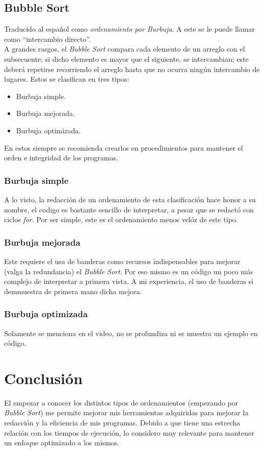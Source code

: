 \documentclass[letterpaper, 12pt]{article}
\begin{document}
    \subsection{Bubble Sort}
    Traducido al español como \emph{ordenamiento por Burbuja}. A este se le puede llamar como ``intercambio directo''. \\\newline
    A grandes rasgos, el \emph{Bubble Sort} compara cada elemento de un arreglo con el subsecuente; si dicho elemento es mayor que el siguiente, se intercambian; este deberá repetirse recorriendo el arreglo hasta que no ocurra ningún intercambio de lugares.
    Estos se clasifican en tres tipos:
    \begin{itemize}
        \item Burbuja simple.
        \item Burbuja mejorada.
        \item Burbuja optimizada.
    \end{itemize}
    En estos siempre se recomienda crearlos en procedimientos para mantener el orden e integridad de los programas.
    \subsubsection{Burbuja simple}
    A lo visto, la redacción de un ordenamiento de esta clasificación hace honor a su nombre, el codigo es bastante sencillo de interpretar, a pesar que se redactó con ciclos \emph{for}. Por ser simple, este es el ordenamiento menos velóz de este tipo.
    \subsubsection{Burbuja mejorada}
    Este requiere el usa de banderas como recursos indispensables para mejorar (valga la redundancia) el \emph{Bubble Sort}. Por eso mismo es un código un poco más complejo de interpretar a primera vista. A mi experiencia, el uso de banderas si demmuestra de primera mano dicha mejora.
    \subsubsection{Burbuja optimizada}
    Solamente se menciona en el video, no se profundiza ni se muestra un ejemplo en código.
    \section{Conclusión}
    El empezar a conocer los distintos tipos de ordenamientos (empezando por \emph{Bubble Sort}) me permite mejorar mis herramientas adquiridas para mejorar la redacción y la eficiencia de mis programas. Debido a que tiene una estrecha relación con los tiempos de ejecución, lo considero
    muy relevante para mantener un enfoque optimizado a los mismos.
\end{document}
